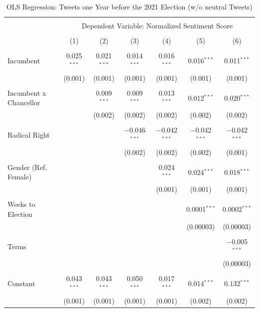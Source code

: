 \documentclass[a4paper,11pt]{article}
\begin{document}
\begin{table}[H]
    \centering
    \caption{OLS Regression: Tweets one Year before the 2021 Election (w/o neutral Tweets)}
    \label{tab:regoneneutral}
\begingroup 
\scriptsize 
\begin{tabular}{@{\extracolsep{5pt}}lcccccc} 
\\[-1.8ex]\hline 
\hline \\[-1.8ex] 
 & \multicolumn{6}{c}{Dependent Variable: Normalized Sentiment Score} \\ 
\cline{2-7} 
\\[-1.8ex] & (1) & (2) & (3) & (4) & (5) & (6)\\ 
\hline \\[-1.8ex] 
 Incumbent & 0.025$^{***}$ & 0.021$^{***}$ & 0.014$^{***}$ & 0.016$^{***}$ & 0.016$^{***}$ & 0.011$^{***}$ \\ 
  & (0.001) & (0.001) & (0.001) & (0.001) & (0.001) & (0.001) \\ 
  & & & & & & \\ 
 Incumbent x Chancellor &  & 0.009$^{***}$ & 0.009$^{***}$ & 0.013$^{***}$ & 0.012$^{***}$ & 0.020$^{***}$ \\ 
  &  & (0.002) & (0.002) & (0.002) & (0.002) & (0.002) \\ 
  & & & & & & \\ 
 Radical Right &  &  & $-$0.046$^{***}$ & $-$0.042$^{***}$ & $-$0.042$^{***}$ & $-$0.042$^{***}$ \\ 
  &  &  & (0.002) & (0.002) & (0.002) & (0.001) \\ 
  & & & & & & \\ 
 Gender (Ref. Female) &  &  &  & 0.024$^{***}$ & 0.024$^{***}$ & 0.018$^{***}$ \\ 
  &  &  &  & (0.001) & (0.001) & (0.001) \\ 
  & & & & & & \\ 
 Weeks to Election &  &  &  &  & 0.0001$^{***}$ & 0.0002$^{***}$ \\ 
  &  &  &  &  & (0.00003) & (0.00003) \\ 
  & & & & & & \\ 
 Terms &  &  &  &  &  & $-$0.005$^{***}$ \\ 
  &  &  &  &  &  & (0.00003) \\ 
  & & & & & & \\ 
 Constant & 0.043$^{***}$ & 0.043$^{***}$ & 0.050$^{***}$ & 0.017$^{***}$ & 0.014$^{***}$ & 0.132$^{***}$ \\ 
  & (0.001) & (0.001) & (0.001) & (0.001) & (0.002) & (0.002) \\ 

\end{tabular}
\end{table}
\end{document}
